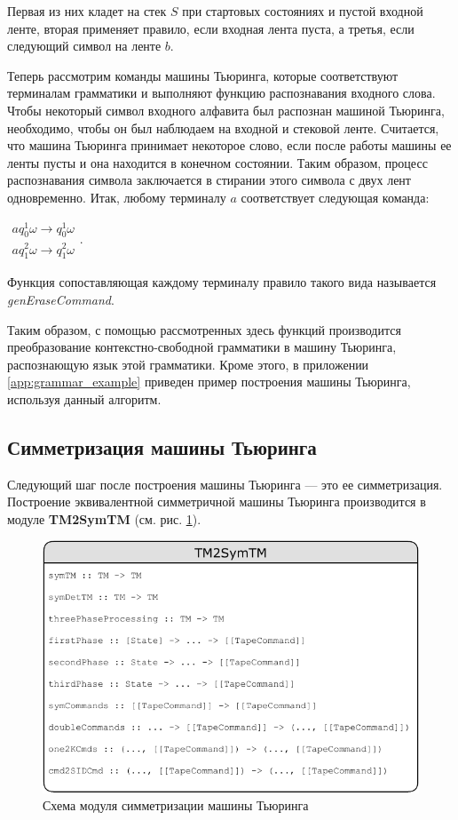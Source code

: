 \documentclass[14pt]{matmex-diploma-custom}
\begin{document}
Первая из них кладет на стек $S$ при стартовых состояниях и пустой входной ленте, вторая применяет правило, если входная лента пуста, а третья, если следующий символ на ленте $b$.  

Теперь рассмотрим команды машины Тьюринга, которые соответствуют терминалам грамматики и выполняют
функцию распознавания входного слова. Чтобы некоторый символ входного алфавита был распознан 
машиной Тьюринга, необходимо, чтобы он был наблюдаем на входной и стековой ленте. Считается, что
машина Тьюринга принимает некоторое слово, если после работы машины ее ленты пусты и она находится в
конечном состоянии. Таким образом, процесс распознавания символа заключается в стирании этого символа
с двух лент одновременно. Итак, любому терминалу $a$ соответствует следующая команда:

$\begin{array}{lcl}
    a q_0^1 \omega \to q_0^1 \omega \\
    a q_1^2 \omega \to q_1^2 \omega 
\end{array}$. 

Функция сопоставляющая каждому терминалу правило такого вида называется \textit{genEraseCommand}.

Таким образом, с помощью рассмотренных здесь функций производится преобразование контекстно-свободной грамматики в машину Тьюринга, распознающую язык этой грамматики. Кроме этого, в приложении \ref{app:grammar_example} приведен пример построения машины Тьюринга, используя данный алгоритм. 

\subsection{Симметризация машины Тьюринга}
Следующий шаг после построения машины Тьюринга --- это ее симметризация. Построение эквивалентной симметричной машины Тьюринга производится в модуле \textbf{TM2SymTM} (см. рис. \ref{fig:TM2SymTM}).

\begin{figure}[H]
\centering
  \includegraphics[width=\linewidth]{pics/TM2SymTM.pdf}
  \caption{Схема модуля симметризации машины Тьюринга}
  \label{fig:TM2SymTM}
\end{figure}
\end{document}
